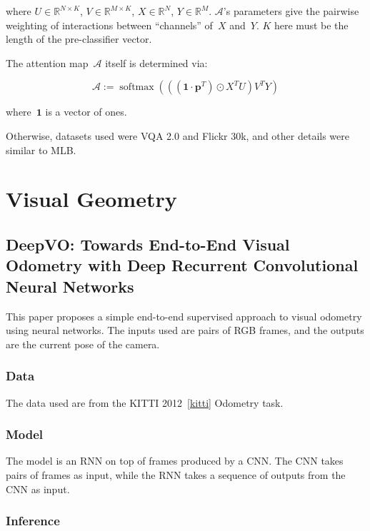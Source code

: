 \documentclass[a4paper, 12pt]{article}
\DeclareMathOperator{\softmax}{softmax}
\begin{document}
where $U \in \mathbb{R}^{N \times K}$, $V \in \mathbb{R}^{M \times K}$,
$X \in \mathbb{R}^N$, $Y \in \mathbb{R}^M$. $\mathcal{A}$'s parameters give the
pairwise weighting of interactions between ``channels'' of~$X$ and~$Y$. $K$
here must be the length of the pre-classifier vector.

The attention map~$\mathcal{A}$ itself is determined via:

\begin{equation}
        \mathcal{A} := \softmax\left(((\mathbf{1} \cdot \mathbf{p}^T) \odot X^T U) V^T Y\right)
\end{equation}

where~$\mathbf{1}$ is a vector of ones.

Otherwise, datasets used were VQA 2.0 and Flickr 30k, and other details were
similar to MLB\@.


\section{Visual Geometry}

\subsection{DeepVO\@: Towards End-to-End Visual Odometry with Deep Recurrent
            Convolutional Neural Networks~\citet{wang-deep-vo-2017}}

This paper proposes a simple end-to-end supervised approach to visual odometry
using neural networks. The inputs used are pairs of RGB frames, and the outputs
are the current pose of the camera.


\subsubsection{Data}

The data used are from the KITTI 2012~\ref{kitti} Odometry task.


\subsubsection{Model}

The model is an RNN on top of frames produced by a CNN\@. The CNN takes pairs
of frames as input, while the RNN takes a sequence of outputs from the CNN as
input.


\subsubsection{Inference}
\end{document}
